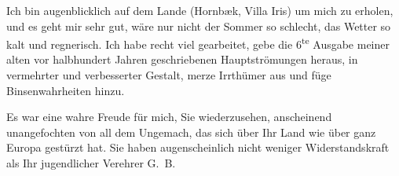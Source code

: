 \pstart
           Ich bin augenblicklich auf dem Lande (Hornbæk,
                  Villa Iris) um mich zu erholen, und es geht
               mir sehr gut, wäre nur nicht der Sommer so schlecht, das Wetter so kalt und
               regnerisch. Ich habe recht viel gearbeitet, gebe die 6\textsuperscript{te}
               Ausgabe meiner alten vor halbhundert Jahren geschriebenen Hauptströmungen heraus, in vermehrter und verbesserter Gestalt,
               merze {\pb}Irrthümer aus und füge
               Binsenwahrheiten hinzu.\pend
           
\pstart
           Es war eine wahre Freude für mich, Sie wiederzusehen, anscheinend unangefochten von
               all dem Ungemach, das sich über Ihr Land wie über ganz Europa gestürzt hat. Sie haben augenscheinlich nicht weniger
               Widerstandskraft als Ihr jugendlicher Verehrer\pend
           \pstart \spacefill\mbox{G. B.}\pend{}
\pstart
           \noindent{}\label{T_L02401-1v}\label{T_L02401-1}\pend
           \endnumbering{}  \newcommand{\dateiname}{L02401}\newcommand{\titel}{Georg Brandes an Arthur Schnitzler, 11. 6. 1923}\newcommand{\editorInnen}{Martin Anton Müller und Gerd-Hermann Susen}
